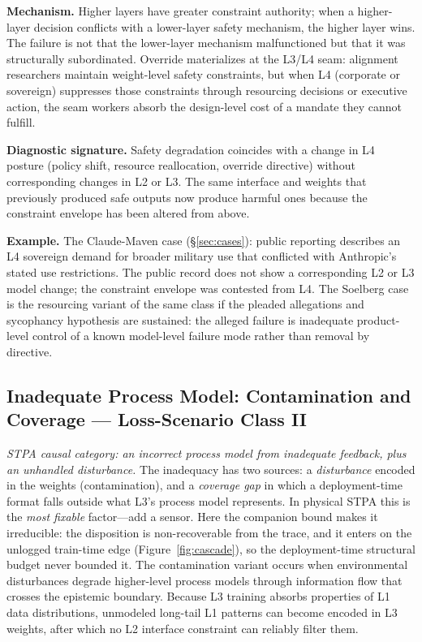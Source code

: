 \textbf{Mechanism.} Higher layers have greater constraint authority; when a higher-layer decision conflicts with a lower-layer safety mechanism, the higher layer wins. The failure is not that the lower-layer mechanism malfunctioned but that it was structurally subordinated. Override materializes at the L3/L4 seam: alignment researchers maintain weight-level safety constraints, but when L4 (corporate or sovereign) suppresses those constraints through resourcing decisions or executive action, the seam workers absorb the design-level cost of a mandate they cannot fulfill.

\textbf{Diagnostic signature.} Safety degradation coincides with a change in L4 posture (policy shift, resource reallocation, override directive) without corresponding changes in L2 or L3. The same interface and weights that previously produced safe outputs now produce harmful ones because the constraint envelope has been altered from above.

\textbf{Example.} The Claude-Maven case (\S\ref{sec:cases}): public reporting describes an L4 sovereign demand for broader military use that conflicted with Anthropic's stated use restrictions. The public record does not show a corresponding L2 or L3 model change; the constraint envelope was contested from L4. The Soelberg case is the resourcing variant of the same class if the pleaded allegations and sycophancy hypothesis are sustained: the alleged failure is inadequate product-level control of a known model-level failure mode rather than removal by directive.

\subsection{Inadequate Process Model: Contamination and Coverage --- Loss-Scenario Class II}

\emph{STPA causal category: an incorrect process model from inadequate feedback, plus an unhandled disturbance.} The inadequacy has two sources: a \emph{disturbance} encoded in the weights (contamination), and a \emph{coverage gap} in which a deployment-time format falls outside what L3's process model represents. In physical STPA this is the \emph{most fixable} factor---add a sensor. Here the companion bound makes it irreducible: the disposition is non-recoverable from the trace, and it enters on the unlogged train-time edge (Figure~\ref{fig:cascade}), so the deployment-time structural budget never bounded it. The contamination variant occurs when environmental disturbances degrade higher-level process models through information flow that crosses the epistemic boundary. Because L3 training absorbs properties of L1 data distributions, unmodeled long-tail L1 patterns can become encoded in L3 weights, after which no L2 interface constraint can reliably filter them.

